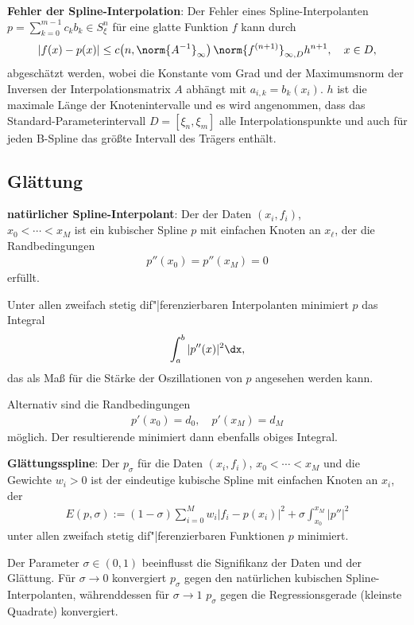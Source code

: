 \linie

\textbf{Fehler der Spline-Interpolation}:
Der Fehler eines Spline-Interpolanten $p = \sum_{k=0}^{m-1} c_k b_k \in S_\xi^n$ für eine glatte
Funktion $f$ kann durch
\begin{align*}
    |f(x) - p(x)| \le c\!\left(n, \norm{A^{-1}}_\infty\right)
    \norm{f^{(n+1)}}_{\infty,D} h^{n+1},\quad
    x \in D,
\end{align*}
abgeschätzt werden, wobei die Konstante vom Grad und der Maximumsnorm der Inversen der
Interpolationsmatrix $A$ abhängt mit $a_{i,k} = b_k(x_i)$.
$h$ ist die maximale Länge der Knotenintervalle und es wird angenommen, dass das
Standard-Parameterintervall $D = [\xi_n, \xi_m]$ alle Interpolationspunkte und auch für jeden
B-Spline das größte Intervall des Trägers enthält.

\pagebreak

\subsection{%
    Glättung%
}

\textbf{natürlicher Spline-Interpolant}:
Der  der Daten $(x_i, f_i)$,\\
$x_0 < \dotsb < x_M$ ist ein kubischer Spline $p$ mit einfachen Knoten an $x_\ell$,
der die Randbedingungen
\begin{align*}
    p''(x_0) = p''(x_M) = 0
\end{align*}
erfüllt.

Unter allen zweifach stetig dif"|ferenzierbaren Interpolanten minimiert $p$ das Integral
\begin{align*}
    \int_a^b |p''(x)|^2 \dx,
\end{align*}
das als Maß für die Stärke der Oszillationen von $p$ angesehen werden kann.

Alternativ sind die Randbedingungen
\begin{align*}
    p'(x_0) = d_0,\quad
    p'(x_M) = d_M
\end{align*}
möglich.
Der resultierende  minimiert dann ebenfalls obiges
Integral.

\linie

\textbf{Glättungsspline}:
Der  $p_\sigma$ für die Daten $(x_i, f_i)$,
$x_0 < \dotsb < x_M$ und die Gewichte $w_i > 0$ ist der eindeutige kubische Spline mit
einfachen Knoten an $x_i$, der
\begin{align*}
    E(p, \sigma) := (1 - \sigma) \sum_{i=0}^M w_i |f_i - p(x_i)|^2 +
    \sigma \int_{x_0}^{x_M} |p''|^2
\end{align*}
unter allen zweifach stetig dif"|ferenzierbaren Funktionen $p$ minimiert.

Der Parameter $\sigma \in (0, 1)$ beeinflusst die Signifikanz der Daten und der Glättung.
Für $\sigma \to 0$ konvergiert $p_\sigma$ gegen den natürlichen kubischen Spline-Interpolanten,
währenddessen für $\sigma \to 1$ $p_\sigma$ gegen die Regressionsgerade
(kleinste Quadrate) konvergiert.

\pagebreak
